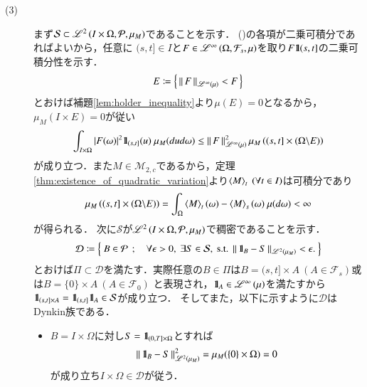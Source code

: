 \begin{prf}
\begin{description}
			\item[(3)]
				まず$\mathcal{S} \subset \mathscr{L}^{2} \left(I \times \Omega,\mathcal{P},\mu_M\right)$であることを示す．
				()の各項が二乗可積分であればよいから，任意に
				$(s,t] \in I$と$F \in \mathscr{L}^{\infty} \left(\Omega,\mathcal{F}_s,\mu\right)$を取り$F \mbox{1}\hspace{-0.25em}\mbox{l}{(s,t]}$の二乗可積分性を示す．
				\begin{align}
					E \coloneqq \left\{\, \left\|\, F\, \right\|_{\mathscr{L}^{\infty} \left(\mu\right)} < F\, \right\}
				\end{align}
				とおけば補題\ref{lem:holder_inequality}より$\mu(E) = 0$となるから，$\mu_M(I \times E) = 0$が従い
				\begin{align}
					\int_{I \times \Omega} |F(\omega)|^2 \mbox{1}\hspace{-0.25em}\mbox{l}_{(s,t]}(u)\ \mu_M(dud\omega) 
					\leq \left\|\, F\, \right\|_{\mathscr{L}^{\infty} \left(\mu\right)}^2 \mu_M\left((s,t] \times (\Omega \backslash E)\right) 
				\end{align}
				が成り立つ．また$M \in \mathcal{M}_{2,c}$であるから，定理\ref{thm:existence_of_quadratic_variation}より$\inprod<M>_t\ (\forall t \in I)$は可積分であり
				\begin{align}
					\mu_M\left((s,t] \times (\Omega \backslash E)\right) = \int_{\Omega} \inprod<M>_t(\omega) - \inprod<M>_s(\omega)\ \mu(d\omega) < \infty
				\end{align}
				が得られる．
				次に$\mathcal{S}$が$\mathscr{L}^{2} \left(I \times \Omega,\mathcal{P},\mu_M\right)$で稠密であることを示す．
				\begin{align}
					\mathcal{D} \coloneqq \left\{\ B \in \mathcal{P}\ \, ; \quad \mbox{$\forall \epsilon > 0,\ \exists S \in \mathcal{S},\ \mbox{s.t.}\ \left\|\, \mbox{1}\hspace{-0.25em}\mbox{l}_B - S\, \right\|_{\mathscr{L}^{2} \left(\mu_M\right)} < \epsilon.$}\ \right\}
				\end{align}
				とおけば$\Pi \subset \mathcal{D}$を満たす．実際任意の$B \in \Pi$は$B = (s,t] \times A\ (A \in \mathcal{F}_s)$或は$B = \{0\} \times A\ (A \in \mathcal{F}_0)$
				と表現され，$\mbox{1}\hspace{-0.25em}\mbox{l}_A \in \mathscr{L}^{\infty} \left(\mu\right)$を満たすから$\mbox{1}\hspace{-0.25em}\mbox{l}_{(s,t] \times A} = \mbox{1}\hspace{-0.25em}\mbox{l}_{(s,t]} \mbox{1}\hspace{-0.25em}\mbox{l}_A \in \mathcal{S}$が成り立つ．
				そしてまた，以下に示すように$\mathcal{D}$はDynkin族である．
				\begin{itemize}
					\item $B = I \times \Omega$に対し$S = \mbox{1}\hspace{-0.25em}\mbox{l}_{(0,T] \times \Omega}$とすれば
						\begin{align}
							\left\|\, \mbox{1}\hspace{-0.25em}\mbox{l}_B - S\, \right\|_{\mathscr{L}^{2} \left(\mu_M\right)}^2
							= \mu_M(\{0\} \times \Omega)
							= 0
						\end{align}
						が成り立ち$I \times \Omega \in \mathcal{D}$が従う．
					

\end{itemize}
\end{description}
\end{prf}
